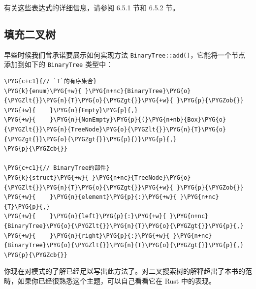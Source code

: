 有关这些表达式的详细信息，请参阅 6.5.1 节和 6.5.2 节。

\subsection{填充二叉树}

早些时候我们曾承诺要展示如何实现方法 \texttt{BinaryTree::add()}，它能将一个节点添加到如下的 \texttt{BinaryTree} 类型中：

\begin{Verbatim}[commandchars=\\\{\},breaklines=true,breakanywhere=true,fontsize=\codefont,xleftmargin=17bp]
\PYG{c+c1}{// `T`的有序集合}
\PYG{k}{enum}\PYG{+w}{ }\PYG{n+nc}{BinaryTree}\PYG{o}{\PYGZlt{}}\PYG{n}{T}\PYG{o}{\PYGZgt{}}\PYG{+w}{ }\PYG{p}{\PYGZob{}}
\PYG{+w}{    }\PYG{n}{Empty}\PYG{p}{,}
\PYG{+w}{    }\PYG{n}{NonEmpty}\PYG{p}{(}\PYG{n+nb}{Box}\PYG{o}{\PYGZlt{}}\PYG{n}{TreeNode}\PYG{o}{\PYGZlt{}}\PYG{n}{T}\PYG{o}{\PYGZgt{}}\PYG{o}{\PYGZgt{}}\PYG{p}{)}\PYG{p}{,}
\PYG{p}{\PYGZcb{}}

\PYG{c+c1}{// BinaryTree的部件}
\PYG{k}{struct}\PYG{+w}{ }\PYG{n+nc}{TreeNode}\PYG{o}{\PYGZlt{}}\PYG{n}{T}\PYG{o}{\PYGZgt{}}\PYG{+w}{ }\PYG{p}{\PYGZob{}}
\PYG{+w}{    }\PYG{n}{element}\PYG{p}{:}\PYG{+w}{ }\PYG{n+nc}{T}\PYG{p}{,}
\PYG{+w}{    }\PYG{n}{left}\PYG{p}{:}\PYG{+w}{ }\PYG{n+nc}{BinaryTree}\PYG{o}{\PYGZlt{}}\PYG{n}{T}\PYG{o}{\PYGZgt{}}\PYG{p}{,}
\PYG{+w}{    }\PYG{n}{right}\PYG{p}{:}\PYG{+w}{ }\PYG{n+nc}{BinaryTree}\PYG{o}{\PYGZlt{}}\PYG{n}{T}\PYG{o}{\PYGZgt{}}\PYG{p}{,}
\PYG{p}{\PYGZcb{}}
\end{Verbatim}

你现在对模式的了解已经足以写出此方法了。对二叉搜索树的解释超出了本书的范畴，如果你已经很熟悉这个主题，可以自己看看它在 Rust 中的表现。

